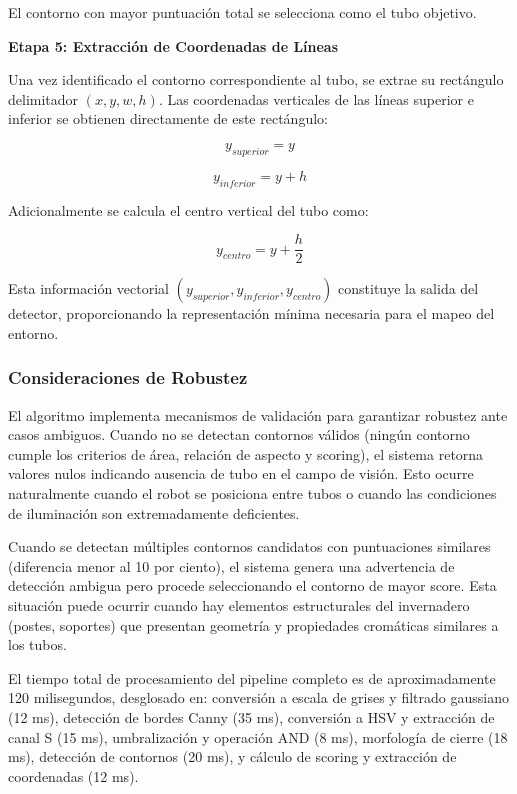 El contorno con mayor puntuación total se selecciona como el tubo objetivo.

\textbf{Etapa 5: Extracción de Coordenadas de Líneas}

Una vez identificado el contorno correspondiente al tubo, se extrae su rectángulo delimitador $(x, y, w, h)$. Las coordenadas verticales de las líneas superior e inferior se obtienen directamente de este rectángulo:

\begin{equation}
y_{superior} = y
\end{equation}

\begin{equation}
y_{inferior} = y + h
\end{equation}

Adicionalmente se calcula el centro vertical del tubo como:

\begin{equation}
y_{centro} = y + \frac{h}{2}
\end{equation}

Esta información vectorial $(y_{superior}, y_{inferior}, y_{centro})$ constituye la salida del detector, proporcionando la representación mínima necesaria para el mapeo del entorno.

\subsubsection{Consideraciones de Robustez}

El algoritmo implementa mecanismos de validación para garantizar robustez ante casos ambiguos. Cuando no se detectan contornos válidos (ningún contorno cumple los criterios de área, relación de aspecto y scoring), el sistema retorna valores nulos indicando ausencia de tubo en el campo de visión. Esto ocurre naturalmente cuando el robot se posiciona entre tubos o cuando las condiciones de iluminación son extremadamente deficientes.

Cuando se detectan múltiples contornos candidatos con puntuaciones similares (diferencia menor al 10 por ciento), el sistema genera una advertencia de detección ambigua pero procede seleccionando el contorno de mayor score. Esta situación puede ocurrir cuando hay elementos estructurales del invernadero (postes, soportes) que presentan geometría y propiedades cromáticas similares a los tubos.

El tiempo total de procesamiento del pipeline completo es de aproximadamente 120 milisegundos, desglosado en: conversión a escala de grises y filtrado gaussiano (12 ms), detección de bordes Canny (35 ms), conversión a HSV y extracción de canal S (15 ms), umbralización y operación AND (8 ms), morfología de cierre (18 ms), detección de contornos (20 ms), y cálculo de scoring y extracción de coordenadas (12 ms).
